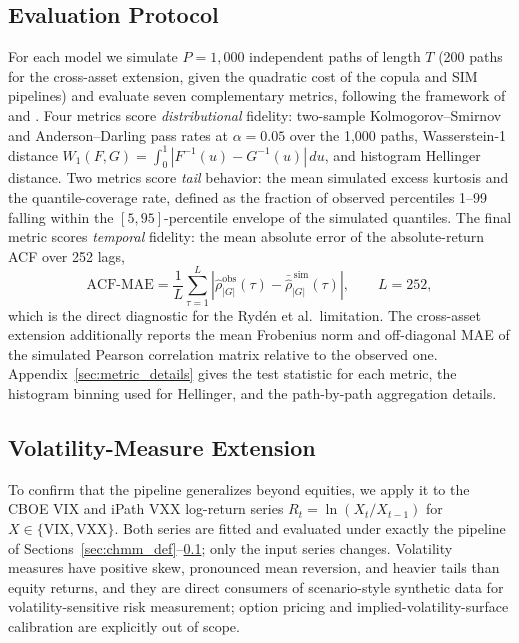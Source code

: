 \subsection{Evaluation Protocol}
\label{sec:metrics}

For each model we simulate $P = 1{,}000$ independent paths of length $T$ (200 paths for the cross-asset extension, given the quadratic cost of the copula and SIM pipelines) and evaluate seven complementary metrics, following the framework of \cite{stenger2024thinking} and \cite{alswaidan2026hybrid}.
Four metrics score \emph{distributional} fidelity: two-sample Kolmogorov--Smirnov \cite{kolmogorov1933, smirnov1948} and Anderson--Darling pass rates at $\alpha = 0.05$ over the 1{,}000 paths, Wasserstein-1 distance $W_1(F, G) = \int_0^1 |F^{-1}(u) - G^{-1}(u)|\, du$, and histogram Hellinger distance.
Two metrics score \emph{tail} behavior: the mean simulated excess kurtosis and the quantile-coverage rate, defined as the fraction of observed percentiles 1--99 falling within the $[5, 95]$-percentile envelope of the simulated quantiles.
The final metric scores \emph{temporal} fidelity: the mean absolute error of the absolute-return ACF over 252 lags,
\begin{equation}
    \text{ACF-MAE} = \frac{1}{L}\sum_{\tau=1}^{L} \left| \hat\rho^{\text{obs}}_{|G|}(\tau) - \bar{\hat\rho}^{\,\text{sim}}_{|G|}(\tau) \right|,
    \qquad L = 252,
    \label{eq:acf_mae}
\end{equation}
which is the direct diagnostic for the Ryd\'{e}n et al.\ limitation.
The cross-asset extension additionally reports the mean Frobenius norm and off-diagonal MAE of the simulated Pearson correlation matrix relative to the observed one.
Appendix~\ref{sec:metric_details} gives the test statistic for each metric, the histogram binning used for Hellinger, and the path-by-path aggregation details.

\subsection{Volatility-Measure Extension}
\label{sec:vix_methods}

To confirm that the pipeline generalizes beyond equities, we apply it to the CBOE VIX and iPath VXX log-return series
$R_t = \ln(X_t / X_{t-1})$ for $X \in \{\text{VIX}, \text{VXX}\}$.
Both series are fitted and evaluated under exactly the pipeline of Sections~\ref{sec:chmm_def}--\ref{sec:metrics}; only the input series changes.
Volatility measures have positive skew, pronounced mean reversion, and heavier tails than equity returns, and they are direct consumers of scenario-style synthetic data for volatility-sensitive risk measurement; option pricing and implied-volatility-surface calibration are explicitly out of scope.
